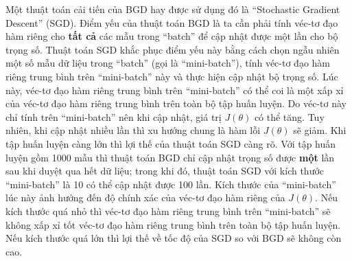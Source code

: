 	Một thuật toán cải tiến của BGD hay được sử dụng đó là ``Stochastic Gradient Descent'' (SGD).
	Điểm yếu của thuật toán BGD là ta cần phải tính véc-tơ đạo hàm riêng cho \textbf{tất cả} các mẫu trong ``batch'' để cập nhật được một lần cho bộ trọng số.
	Thuật toán SGD khắc phục điểm yếu này bằng cách chọn ngẫu nhiên một số mẫu dữ liệu trong ``batch'' (gọi là ``mini-batch''), tính véc-tơ đạo hàm riêng trung bình trên ``mini-batch'' này và thực hiện cập nhật bộ trọng số.
	Lúc này, véc-tơ đạo hàm riêng trung bình trên ``mini-batch'' có thể coi là một xấp xỉ của véc-tơ đạo hàm riêng trung bình trên toàn bộ tập huấn luyện.
	Do véc-tơ này chỉ tính trên ``mini-batch'' nên khi cập nhật, giá trị $J(\theta)$ có thể tăng.
	Tuy nhiên, khi cập nhật nhiều lần thì xu hướng chung là hàm lỗi $J(\theta)$ sẽ giảm.
	Khi tập huấn luyện càng lớn thì lợi thế của thuật toán SGD càng rõ.
	Với tập huấn luyện gồm 1000 mẫu thì thuật toán BGD chỉ cập nhật trọng số được \textbf{một} lần sau khi duyệt qua hết dữ liệu; trong khi đó, thuật toán SGD với kích thước ``mini-batch'' là 10 có thể cập nhật được 100 lần.
	Kích thước của ``mini-batch'' lúc này ảnh hưởng đến độ chính xác của véc-tơ đạo hàm riêng của $J(\theta)$.
	Nếu kích thước quá nhỏ thì véc-tơ đạo hàm riêng trung bình trên ``mini-batch'' sẽ không xấp xỉ tốt véc-tơ đạo hàm riêng trung bình trên toàn bộ tập huấn luyện.
	Nếu kích thước quá lớn thì lợi thế về tốc độ của SGD so với BGD sẽ không còn cao.
	

